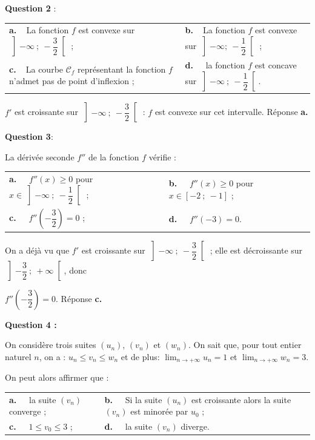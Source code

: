 \documentclass[10pt]{article}
\begin{document}
\textbf{Question 2 }:

\begin{center}
\begin{tabularx}{\linewidth}{X X}
\textbf{a.~~}La fonction $f$ est convexe sur $\left]- \infty~;~- \dfrac32\right[$ ;&
\textbf{b.~~}La fonction $f$ est convexe sur $\left]- \infty;~- \dfrac12\right[$ ;\\
\textbf{c.~~}La courbe $\mathcal{C}_f$ représentant la fonction $f$ n'admet pas de point d'inflexion ; &\textbf{d.~~} la fonction $f$ est concave sur $\left] - \infty~;~- \dfrac12\right[$.
\end{tabularx}
\end{center}

$f'$ est croissante sur $\left]- \infty~;~- \dfrac32\right[$ : $f$ est convexe sur cet intervalle. Réponse \textbf{a.}
\medskip

\textbf{Question 3}:

La dérivée seconde $f''$  de la fonction $f$ vérifie :

\begin{center}
\begin{tabularx}{\linewidth}{X X}
\textbf{a.~~} $f''(x) \geqslant  0$ pour $x \in \left]-\infty~;~- \dfrac12\right[$ ; &\textbf{b.~~} $f''(x) \geqslant  0$ pour $x \in [- 2~;~- 1]$ ;\\
\textbf{c.~~} $f''\left(- \dfrac32 \right) = 0$ ;&\textbf{d.~~} $f''(- 3) = 0$.
\end{tabularx}
\end{center}
On a déjà vu que $f'$ est croissante sur $\left]- \infty~;~- \dfrac32\right[$ ; elle est décroissante sur $\left]- \dfrac32~;~+ \infty\right[$, donc 

$f''\left(- \dfrac32\right) = 0$. Réponse \textbf{c.}

\medskip

\textbf{Question 4 :}

\medskip

On considère trois suites $\left(u_n\right)$, $\left(v_n\right)$ et $\left(w_n\right)$. On sait que, pour tout entier naturel $n$, on a : $u_n \leqslant v_n\leqslant  w_n$ et de plus: $\displaystyle\lim_{n \to + \infty} u_n= 1$ et $\displaystyle\lim_{n \to + \infty} w_n= 3$.

On peut alors affirmer que :

\begin{center}
\begin{tabularx}{\linewidth}{X X}
\textbf{a.~~} la suite $\left(v_n\right)$ converge ;&\textbf{b.~~} Si la suite 
$\left(u_n\right)$ est croissante alors la suite $\left(v_n\right)$ est minorée par $u_0$ ;\\
\textbf{c.~~} $1 \leqslant  v_0 \leqslant 3$ ;&\textbf{d.~~} la suite $\left(v_n\right)$ diverge.
\end{tabularx}
\end{center}
\end{document}
